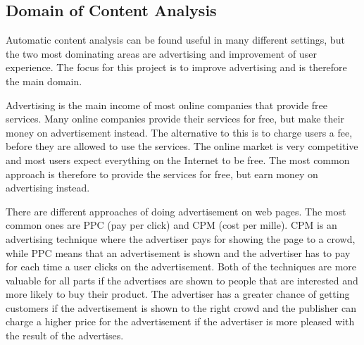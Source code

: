 \subsection{Domain of Content Analysis}
Automatic content analysis can be found useful in many different settings, but the 
two most dominating areas are advertising and improvement of user experience. The focus for this project is to improve advertising and is therefore the main domain.

Advertising is the main income of most online companies that provide free services. Many online companies provide their services for free, but make their money on advertisement instead. The alternative to this is to charge users a fee, before they are allowed to use the services. The online market is very competitive and most users expect everything on the Internet to be free. The most common approach is therefore to provide the services for free, but earn money on advertising instead. 




There are different approaches of doing advertisement on web pages. The most common ones are PPC (pay per click) and CPM (cost per mille). CPM is an  advertising technique where the advertiser pays for showing the page to a crowd, while PPC means that an advertisement is shown and the advertiser has to pay for each time a user clicks on the advertisement. Both of the techniques are more valuable for all parts if the advertises are shown to people that are interested and more likely to buy their product. The advertiser has a greater chance of getting customers if the advertisement is shown to the right crowd and the publisher can charge a higher price for the advertisement if the advertiser is more pleased with the result of the advertises.

